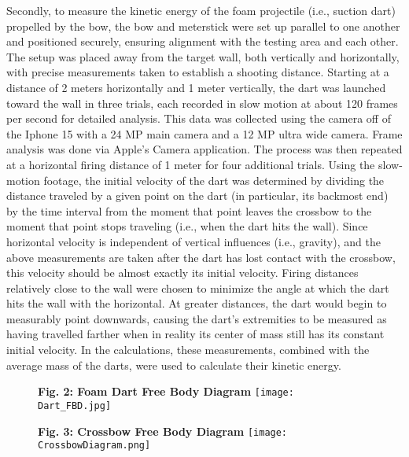 \documentclass[twocolumn, 10pt]{article}
\begin{document}
Secondly, to measure the kinetic energy of the foam projectile (i.e., suction dart) propelled by the bow, the bow and meterstick were set up parallel to one another and positioned securely, ensuring alignment with the testing area and each other. The setup was placed away from the target wall, both vertically and horizontally, with precise measurements taken to establish a shooting distance. Starting at a distance of 2 meters horizontally and 1 meter vertically, the dart was launched toward the wall in three trials, each recorded in slow motion at about 120 frames per second for detailed analysis. This data was collected using the camera off of the Iphone 15 with a 24 MP main camera and a 12 MP ultra wide camera. Frame analysis was done via Apple’s Camera application. The process was then repeated at a horizontal firing distance of 1 meter for four additional trials. Using the slow-motion footage, the initial velocity of the dart was determined by dividing the distance traveled by a given point on the dart (in particular, its backmost end) by the time interval from the moment that point leaves the crossbow to the moment that point stops traveling (i.e., when the dart hits the wall). Since horizontal velocity is independent of vertical influences (i.e., gravity), and the above measurements are taken after the dart has lost contact with the crossbow, this velocity should be almost exactly its initial velocity. Firing distances relatively close to the wall were chosen to minimize the angle at which the dart hits the wall with the horizontal. At greater distances, the dart would begin to measurably point downwards, causing the dart’s extremities to be measured as having travelled farther when in reality its center of mass still has its constant initial velocity. In the calculations, these measurements, combined with the average mass of the darts, were used to calculate their kinetic energy.

 \begin{figure}
    \centering
    \textbf{Fig. 2: Foam Dart Free Body Diagram}
    \texttt{[image: Dart\_FBD.jpg]}
\end{figure}

 \begin{figure}[h]
    \centering
    \textbf{Fig. 3: Crossbow Free Body Diagram}
    \texttt{[image: CrossbowDiagram.png]}
\end{figure}
\end{document}
